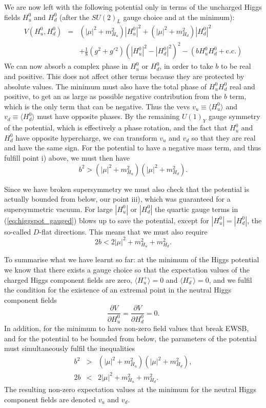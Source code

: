 \documentclass[notes.tex]{subfiles}
\begin{document}
We are now left with the following potential only in terms of the uncharged Higgs fields $H_u^0$ and $H_d^0$ (after the $SU(2)_L$ gauge choice and at the minimum):
\begin{eqnarray}
V(H_u^0,H_d^0) &=& (|\mu|^2 + m_{H_u}^2)|H^0_u|^2 + (|\mu|^2 + m_{H_d}^2)|H^0_d|^2 \nonumber\\
&&+ \frac{1}{8}(g^2 + g'{}^2)(|H_u^0|^2 - |H_d^0|^2)^2 - (bH_u^0H_d^0 + \text{c.c.})
\label{eq:higgspot_gauged}
\end{eqnarray}
We can now absorb a complex phase in $H^0_u$ or $H_d^0$, in order to take $b$ to be real and positive. This does not affect other terms because they are protected by absolute values. The minimum must also have the total phase of $H_u^0H_d^0$ real and positive, to get an as large as possible negative contribution from the $b$ term, which is the only term that can be negative. Thus the vevs $v_u \equiv\langle H_u^0\rangle$ and $v_d \equiv \langle H_d^0\rangle$ must have opposite phases. By the remaining $U(1)_Y$ gauge symmetry of the potential, which is effectively a phase rotation, and the fact that $H^0_u$ and $H_d^0$ have opposite hypercharge, we can transform $v_u$ and $v_d$ so that they are real and have the same sign. For the potential to have a negative mass term, and thus fulfill point i) above, we must then have
\begin{equation}\label{eq:higgsbound2}
b^2 > (|\mu|^2 + m_{H_u}^2)(|\mu|^2 + m_{H_d}^2).
\end{equation}

Since we have broken supersymmetry we must also check that the potential is actually bounded from below, our point iii), which was guaranteed for a supersymmetric vacuum. For large $|H_u^0|$ or $|H_d^0|$ the quartic gauge terms in (\ref{eq:higgspot_gauged}) blows up to save the potential, except for $|H^0_u| = |H^0_d|$, the so-called $D$-flat directions. This means that we must also require
\begin{equation}\label{eq:higgsbound1}
2b < 2|\mu|^2 + m_{H_u}^2 + m_{H_d}^2.
\end{equation}

To summarise what we have learnt so far: at the minimum of the Higgs potential we know that there exists a gauge choice so that the expectation values of the charged Higgs component fields are zero, $\langle H_u^+\rangle =0$ and $\langle H_d^-\rangle =0$, and we fulfil the condition for the existence of an extremal point in the neutral Higgs component fields
\begin{equation}
\frac{\partial V}{\partial H_u^0}=\frac{\partial V}{\partial H_d^0}= 0.
\label{eq:EWSB_condition}
\end{equation}
In addition, for the minimum to have non-zero field values that break EWSB, and for the potential to be bounded from below, the parameters of the potential must simultaneously fulfil the inequalities
\begin{eqnarray}
b^2 &>& (|\mu|^2 + m_{H_u}^2)(|\mu|^2 + m_{H_d}^2), \nonumber\\
2b &<& 2|\mu|^2 + m_{H_u}^2 + m_{H_d}^2. \nonumber
\end{eqnarray}
The resulting non-zero expectation values at the minimum for the neutral Higgs component fields are denoted $v_u$ and $v_d$.
\end{document}
